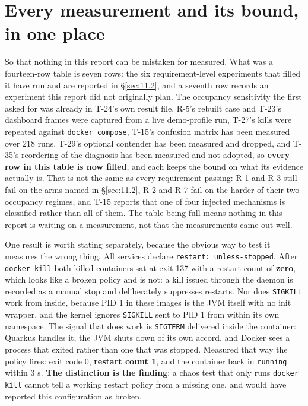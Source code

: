 \section{Every measurement and its bound, in one place}\label{sec:G}

So that nothing in this report can be mistaken for measured. What was a fourteen-row table is seven
rows: the six requirement-level experiments that filled it have run and are reported in §\ref{sec:11.2}, and
a seventh row records an experiment this report did not originally plan. The occupancy sensitivity
the first asked for was already in T-24's own result file, R-5's rebuilt case and T-23's dashboard
frames were captured from a live demo-profile run, T-27's kills were repeated against
\texttt{docker compose}, T-15's confusion matrix has been measured over 218 runs, T-29's optional
contender has been measured and dropped, and T-35's reordering of the diagnosis has been measured
and not adopted, so \textbf{every row in this table is now filled}, and each keeps the bound on
what its evidence actually is. That is not the same as every
requirement passing: R-1 and R-3 still fail on the arms named in §\ref{sec:11.2}, R-2 and R-7 fail on the
harder of their two occupancy regimes, and T-15 reports that one of four injected mechanisms is
classified rather than all of them. The table being full means nothing in this report is waiting on a measurement, not
that the measurements came out well.

One result is worth stating separately, because the obvious way to test it measures the wrong
thing. All \factComposeServices{} services declare \texttt{restart: unless-stopped}. After \texttt{docker kill} both
killed containers sat at exit 137 with a restart count of \textbf{zero}, which looks like a broken
policy and is not: a kill issued through the daemon is recorded as a manual stop and deliberately
suppresses restarts. Nor does \texttt{SIGKILL} work from inside, because PID 1 in these images is
the JVM itself with no init wrapper, and the kernel ignores \texttt{SIGKILL} sent to PID 1 from
within its own namespace. The signal that does work is \texttt{SIGTERM} delivered inside the
container: Quarkus handles it, the JVM shuts down of its own accord, and Docker sees a process that
exited rather than one that was stopped. Measured that way the policy fires: exit code 0,
\textbf{restart count 1}, and the container back in \texttt{running} within 3 s. \textbf{The
distinction is the finding}: a chaos test that only runs \texttt{docker kill} cannot tell a working
restart policy from a missing one, and would have reported this configuration as broken.

